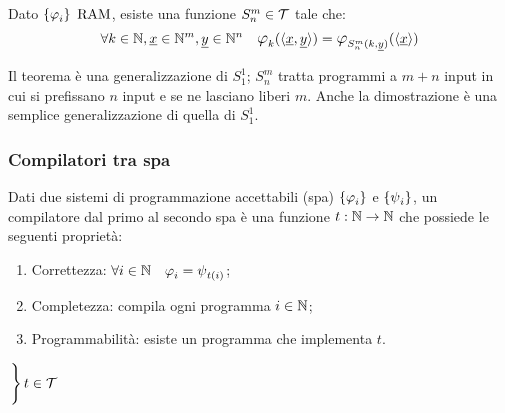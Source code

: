 \begin{theorem}[$S_n^m$]
    Dato $\sistProg$ $\text{RAM}$, esiste una funzione $S_n^m\in\mathcal{T}$ tale che:
    $$ \forall k\in\N,\sottolinea{x}\in\N^m,\sottolinea{y}\in\N^n 
    \quad \semanticaRAM_k(\cantor{\sottolinea{x},\sottolinea{y}})
    = \semanticaRAM_{S_n^m(k,\sottolinea{y})}(\cantor{\sottolinea{x}}) $$
\end{theorem}
Il teorema è una generalizzazione di $S_1^1$; $S_n^m$ tratta programmi a $m+n$
input in cui si prefissano $n$ input e se ne lasciano liberi $m$. Anche la
dimostrazione è una semplice generalizzazione di quella di $S_1^1$.

\subsubsection{Compilatori tra spa}
Dati due sistemi di programmazione accettabili (spa) $\sistProg$ e $\sistProgW$, un
compilatore dal primo al secondo spa è una funzione $t:\mathbb{N}\to\mathbb{N}$ che possiede le
seguenti proprietà:

\begin{minipage}{.66\textwidth}
\begin{enumerate}
    \setlength\itemsep{.4em}
    \item Correttezza: $\forall i\in\N \quad \semanticaRAM_i=\semanticaWHILE_{t(i)}$;
    \item Completezza: compila ogni programma $i\in\mathbb{N}$;
    \item Programmabilità: esiste un programma che implementa $t$.
\end{enumerate}    
\end{minipage}
\begin{minipage}{.25\textwidth}
    \vspace{1.1em}
    $\begin{rcases}
        \phantom{}\\\phantom{}\\
    \end{rcases} t\in\mathcal{T}$
\end{minipage}\vspace{1em}

